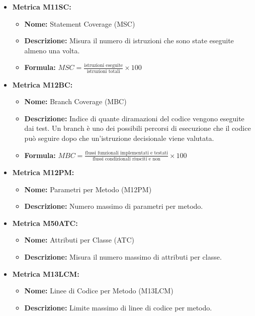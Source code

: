 \begin{itemize}
    \item \textbf{Metrica M11SC:}
          \begin{itemize}
              \item \textbf{Nome:} Statement Coverage (MSC)
              \item \textbf{Descrizione:} Misura il numero di istruzioni che sono state eseguite almeno una volta.
              \item \textbf{Formula:} $MSC = \frac{\text{istruzioni eseguite}}{\text{istruzioni totali}} \times 100$
          \end{itemize}

    \item \textbf{Metrica M12BC:}
          \begin{itemize}
              \item \textbf{Nome:} Branch Coverage (MBC)
              \item \textbf{Descrizione:} Indice di quante diramazioni del codice vengono eseguite dai test. Un branch è uno dei possibili percorsi di esecuzione che il codice può seguire dopo che un'istruzione decisionale viene valutata.
              \item \textbf{Formula:} $MBC = \frac{\text{flussi funzionali implementati e testati}}{\text{flussi condizionali riusciti e non}} \times 100$
          \end{itemize}
          \item \textbf{Metrica M12PM:}
          \begin{itemize}
              \item \textbf{Nome:} Parametri per Metodo (M12PM)
              \item \textbf{Descrizione:} Numero massimo di parametri per metodo.
            \end{itemize}
            \item \textbf{Metrica M50ATC:}
            \begin{itemize}
                \item \textbf{Nome:} Attributi per Classe (ATC)
                \item \textbf{Descrizione:} Misura il numero massimo di attributi per classe.
            \end{itemize}
          
    
    \item \textbf{Metrica M13LCM:}
          \begin{itemize}
              \item \textbf{Nome:} Linee di Codice per Metodo (M13LCM)
              \item \textbf{Descrizione:} Limite massimo di linee di codice per metodo.
            \end{itemize}
\end{itemize}

